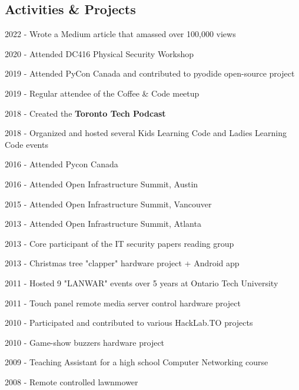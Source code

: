 \documentclass[margin,line]{resume}
\begin{document}
\begin{resume}
\sectionline

    \section{\mysidestyle \textbf{\large{A}\small{ctivities \& Projects}}}

    \begin{list2}
        \item 2022 - Wrote a Medium article that amassed over 100,000 views
        \item 2020 - Attended DC416 Physical Security Workshop
        \item 2019 - Attended PyCon Canada and contributed to pyodide open-source project
        \item 2019 - Regular attendee of the Coffee \& Code meetup
        \item 2018 - Created the \textbf{Toronto Tech Podcast}
        \item 2018 - Organized and hosted several Kids Learning Code and Ladies Learning Code events
        \item 2016 - Attended Pycon Canada
        \item 2016 - Attended Open Infrastructure Summit, Austin
        \item 2015 - Attended Open Infrastructure Summit, Vancouver
        \item 2013 - Attended Open Infrastructure Summit, Atlanta
        \item 2013 - Core participant of the IT security papers reading group
        \item 2013 - Christmas tree "clapper" hardware project + Android app
        \item 2011 - Hosted 9 "LANWAR" events over 5 years at Ontario Tech University
        \item 2011 - Touch panel remote media server control hardware project
        \item 2010 - Participated and contributed to various HackLab.TO projects
        \item 2010 - Game-show buzzers hardware project
        \item 2009 - Teaching Assistant for a high school Computer Networking course
        \item 2008 - Remote controlled lawnmower
    \end{list2}\vspace{-1.5mm}


\end{resume}
\end{document}
